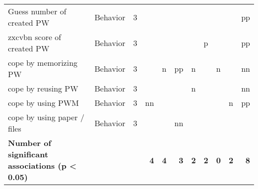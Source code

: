 \begin{table}[htbp]
{\begin{tabular}{lrrrrrrrrrr}
 Guess number of created PW & \multicolumn{1}{l}{Behavior} & \multicolumn{1}{r|}{3} &       &       &       &       & \multicolumn{1}{r|}{} &       &       & \multicolumn{1}{l}{\cellcolor[rgb]{ 0,  .729,  .22} \textcolor[rgb]{ 1,  1,  1}{pp}} \\
 zxcvbn score of created PW & \multicolumn{1}{l}{Behavior} & \multicolumn{1}{r|}{3} &       &       &       &       & \multicolumn{1}{l|}{\cellcolor[rgb]{ .486,  .682,  0} \textcolor[rgb]{ 1,  1,  1}{p}} &       &       & \multicolumn{1}{l}{\cellcolor[rgb]{ 0,  .729,  .22} \textcolor[rgb]{ 1,  1,  1}{pp}} \\
 cope by memorizing PW & \multicolumn{1}{l}{Behavior} & \multicolumn{1}{r|}{3} &       & \multicolumn{1}{l}{\cellcolor[rgb]{ .871,  .549,  0} \textcolor[rgb]{ 1,  1,  1}{n}} & \multicolumn{1}{l}{\cellcolor[rgb]{ 0,  .729,  .22} \textcolor[rgb]{ 1,  1,  1}{pp}} & \multicolumn{1}{l}{\cellcolor[rgb]{ .871,  .549,  0} \textcolor[rgb]{ 1,  1,  1}{n}} & \multicolumn{1}{r|}{} & \multicolumn{1}{l}{\cellcolor[rgb]{ .871,  .549,  0} \textcolor[rgb]{ 1,  1,  1}{n}} &       & \multicolumn{1}{l}{\cellcolor[rgb]{ .973,  .463,  .427} \textcolor[rgb]{ 1,  1,  1}{nn}} \\
 cope by reusing PW & \multicolumn{1}{l}{Behavior} & \multicolumn{1}{r|}{3} &       &       &       & \multicolumn{1}{l}{\cellcolor[rgb]{ .871,  .549,  0} \textcolor[rgb]{ 1,  1,  1}{n}} & \multicolumn{1}{r|}{} &       &       & \multicolumn{1}{l}{\cellcolor[rgb]{ .973,  .463,  .427} \textcolor[rgb]{ 1,  1,  1}{nn}} \\
 cope by using PWM & \multicolumn{1}{l}{Behavior} & \multicolumn{1}{r|}{3} & \multicolumn{1}{l}{\cellcolor[rgb]{ .973,  .463,  .427} \textcolor[rgb]{ 1,  1,  1}{nn}} &       &       &       & \multicolumn{1}{r|}{} &       & \multicolumn{1}{l}{\cellcolor[rgb]{ .871,  .549,  0} \textcolor[rgb]{ 1,  1,  1}{n}} & \multicolumn{1}{l}{\cellcolor[rgb]{ 0,  .729,  .22} \textcolor[rgb]{ 1,  1,  1}{pp}} \\
 cope by using paper / files & \multicolumn{1}{l}{Behavior} & \multicolumn{1}{r|}{3} &       &       & \multicolumn{1}{l}{\cellcolor[rgb]{ .973,  .463,  .427} \textcolor[rgb]{ 1,  1,  1}{nn}} &       & \multicolumn{1}{r|}{} &       &       &  \\
 \midrule
 \midrule
 \textbf{Number of significant associations (p < 0.05)} &       &       & \textbf{4} & \textbf{4} & \textbf{3} & \textbf{2} & \textbf{2} & \textbf{0} & \textbf{2} & \textbf{8} \\
 \end{tabular}%
}

\end{table}%
